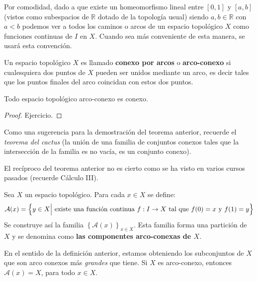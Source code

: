 \documentclass[12pt]{report}
\theoremstyle{largebreak}
\newcommand\cf[3]{\ensuremath{#1:#2\rightarrow#3}}
\begin{document}
    \begin{obs}
        Por comodidad, dado a que existe un homeomorfismo lineal entre $[0,1]$ y $[a,b]$ (vistos como subespacios de $\mathbb{R}$ dotado de la topología usual) siendo $a,b\in\mathbb{R}$ con $a<b$ podemos ver a todos los caminos o arcos de un espacio topológico $X$ como funciones continuas de $I$ en $X$. Cuando sea más conveniente de esta manera, se usará esta convención.
    \end{obs}

    \begin{mydef}
        Un espacio topológico $X$ es llamado \textbf{conexo por arcos} o \textbf{arco-conexo} si cualesquiera dos puntos de $X$ pueden ser unidos mediante un arco, es decir tales que los puntos finales del arco coincidan con estos dos puntos.
    \end{mydef}

    \begin{theor}
        Todo espacio topológico arco-conexo es conexo.
    \end{theor}

    \begin{proof}
        Ejercicio.
    \end{proof}

    Como una sugerencia para la demostración del teorema anterior, recuerde el \textit{teorema del cactus} (la unión de una familia de conjuntos conexos tales que la intersección de la familia es no vacía, es un conjunto conexo).

    El recíproco del teorema anterior no es cierto como se ha visto en varios cursos pasados (recuerde Cálculo III).

    \begin{mydef}
        Sea $X$ un espacio topológico. Para cada $x\in X$ se define:
        \begin{equation*}
            \mathcal{A}(x)=\left\{y\in X\Big|\textup{ existe una función continua }\cf{f}{I}{X} \textup{ tal que }f(0)=x \textup{ y }f(1)=y \right\}
        \end{equation*}
        Se construye así la familia $\left\{\mathcal{A}(x) \right\}_{ x\in X}$. Esta familia forma una partición de $X$ y se denomina como \textbf{las componentes arco-conexas de $X$}.
    \end{mydef}

    En el sentido de la definición anterior, estamos obteniendo los subconjuntos de $X$ que son arco conexos más \textit{grandes} que tiene. Si $X$ es arco-conexo, entonces $\mathcal{A}(x)=X$, para todo $x\in X$.
\end{document}

